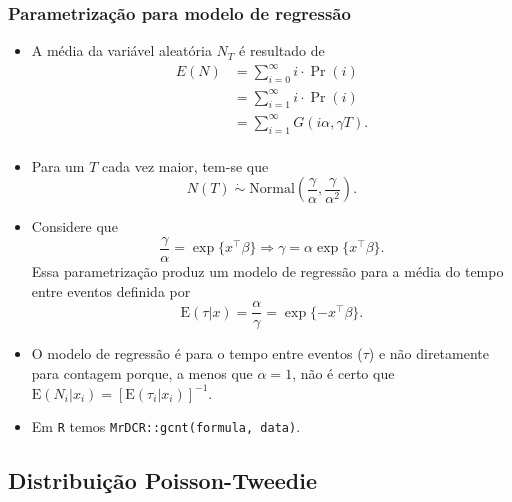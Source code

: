 \documentclass[10pt, aspectratio=169]{beamer}\usepackage[]{graphicx}\usepackage[]{color}
\begin{document}
\begin{frame}[allowframebreaks]
  \frametitle{Parametrização para modelo de regressão}
  \begin{itemize}
  \item A média da variável aleatória $N_T$ é resultado de
    \begin{align*}
      E(N) &= \sum_{i=0}^{\infty} i\cdot \Pr(i) \\
           &= \sum_{i=1}^{\infty} i\cdot \Pr(i)\\
           &= \sum_{i=1}^{\infty} G(i\alpha, \gamma T).\\
    \end{align*}
  \item Para um $T$ cada vez maior, tem-se que
    \begin{equation*}
      N(T)\; \dot{\sim}\; \text{Normal}\left(
        \frac{\gamma}{\alpha},
        \frac{\gamma}{\alpha^2}\right).
    \end{equation*}
  \item Considere que
    $$\frac{\gamma}{\alpha} = \exp\{x^{\top}\beta\} \Rightarrow
    \gamma = \alpha \exp\{x^{\top}\beta\}.$$
    Essa parametrização produz um modelo de regressão para a média
    do tempo entre eventos definida por
    $$\text{E}(\tau|x) = \frac{\alpha}{\gamma} =
    \exp\{-x^{\top}\beta\}.$$
  \item O modelo de regressão é para o tempo entre eventos ($\tau$)
    e não diretamente para contagem porque, a menos que
    $\alpha = 1$, não é certo que
    $\text{E}(N_i|x_i) = [\text{E}(\tau_i|x_i)]^{-1}$.
  \item Em \texttt{R} temos \texttt{MrDCR::gcnt(formula, data)}.
  \end{itemize}
  
\end{frame}

\subsection{Distribuição Poisson-Tweedie}
\end{document}
